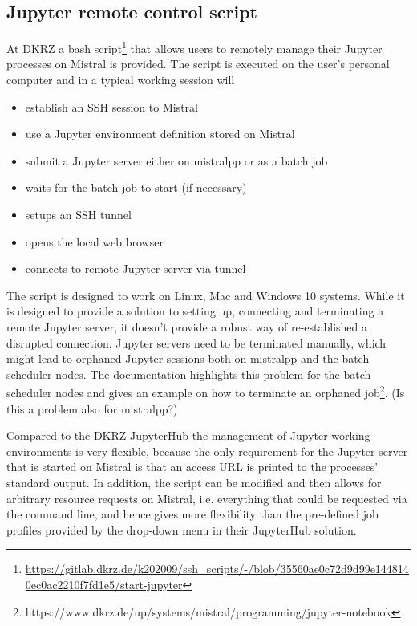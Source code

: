 \subsection{Jupyter remote control script}

At DKRZ a bash script\footnote{\url{https://gitlab.dkrz.de/k202009/ssh_scripts/-/blob/35560ae0c72d9d99e1448140ec0ac2210f7fd1e5/start-jupyter}} that allows users to remotely manage their Jupyter processes on Mistral is provided.
The script is executed on the user's personal computer and in a typical working session will
\begin{itemize}
    \item establish an SSH session to Mistral
    \item use a Jupyter environment definition stored on Mistral
    \item submit a Jupyter server either on mistralpp or as a batch job
    \item waits for the batch job to start (if necessary)
    \item setups an SSH tunnel
    \item opens the local web browser
    \item connects to remote Jupyter server via tunnel
\end{itemize}

The script is designed to work on Linux, Mac and Windows 10 systems.
While it is designed to provide a solution to setting up, connecting and terminating a remote Jupyter server, it doesn't provide a robust way of re-established a disrupted connection.
Jupyter servers need to be terminated manually, which might lead to orphaned Jupyter sessions both on mistralpp and the batch scheduler nodes.
The documentation highlights this problem for the batch scheduler nodes and gives an example on how to terminate an orphaned job\footnote{https://www.dkrz.de/up/systems/mistral/programming/jupyter-notebook}.
(Is this a problem also for mistralpp?)

Compared to the DKRZ JupyterHub the management of Jupyter working environments is very flexible, because the only requirement for the Jupyter server that is started on Mistral is that an access URL is printed to the processes' standard output.
In addition, the script can be modified and then allows for arbitrary resource requests on Mistral, i.e. everything that could be requested via the command line, and hence gives more flexibility than the pre-defined job profiles provided by the drop-down menu in their JupyterHub solution.
